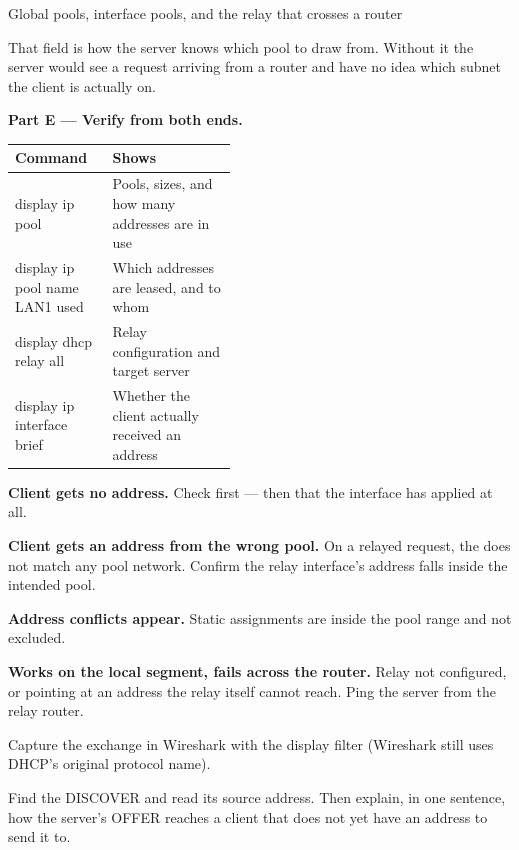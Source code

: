 \begin{labproject}{Global pools, interface pools, and the relay that crosses a router}
\begin{keyidea}
That field is how the server knows which pool to draw from. Without it the server would see a request arriving from a router and have no idea which subnet the client is actually on.
\end{keyidea}

\medskip\noindent\textbf{Part E --- Verify from both ends.}\par

\begin{commandmap}
\begin{tabularx}{\linewidth}{@{}>{\ttfamily}p{0.44\linewidth}X@{}}
\toprule
\rowcolor{MLPaleBlue!92}
\textrm{\bfseries Command} & \bfseries Shows \\
\midrule
display ip pool & Pools, sizes, and how many addresses are in use \\
display ip pool name LAN1 used & Which addresses are leased, and to whom \\
display dhcp relay all & Relay configuration and target server \\
display ip interface brief & Whether the client actually received an address \\
\bottomrule
\end{tabularx}
\end{commandmap}

\begin{troubleshoot}
\textbf{Client gets no address.} Check  first --- then that the interface has  applied at all.

\textbf{Client gets an address from the wrong pool.} On a relayed request, the  does not match any pool network. Confirm the relay interface's address falls inside the intended pool.

\textbf{Address conflicts appear.} Static assignments are inside the pool range and not excluded.

\textbf{Works on the local segment, fails across the router.} Relay not configured, or pointing at an address the relay itself cannot reach. Ping the server from the relay router.
\end{troubleshoot}

\begin{tryit}
Capture the exchange in Wireshark with the display filter  (Wireshark still uses DHCP's original protocol name).

Find the DISCOVER and read its source address. Then explain, in one sentence, how the server's OFFER reaches a client that does not yet have an address to send it to.
\end{tryit}
\end{labproject}

